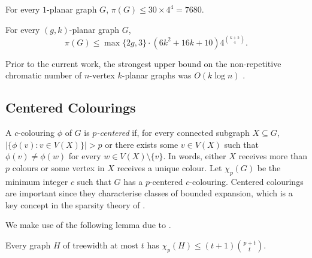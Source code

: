 \documentclass{patmorin}
\renewcommand{\ge}{\geqslant}
\renewcommand{\le}{\leqslant}
\renewcommand{\leq}{\leqslant}
\begin{document}
\begin{cor}
  For every $1$-planar graph $G$, $\pi(G)\le 30\times 4^4=7680$. 
\end{cor}

\begin{cor}
  For every $(g,k)$-planar graph $G$, 
  \[ 
    \pi(G)\le \max\{2g,3\}\cdot(6k^2+16k+10) 4^{\binom{k+5}{4}}. 
     \]
\end{cor}



Prior to the current work, the strongest upper bound on the non-repetitive chromatic number of $n$-vertex  $k$-planar graphs was $O(k\log n)$ \cite{dujmovic.morin.ea:layered}.

\subsection{Centered Colourings}

A $c$-colouring $\phi$ of $G$ is \emph{$p$-centered} if, for every connected subgraph $X\subseteq G$, $|\{\phi(v):v\in V(X)\}| > p$ or there exists some $v\in V(X)$ such that $\phi(v)\neq \phi(w)$ for every $w\in V(X)\setminus\{v\}$.  In words, either $X$ receives more than $p$ colours or some vertex in $X$ receives a unique colour.  Let $\chi_p(G)$ be the minimum integer $c$ such that $G$ has a $p$-centered $c$-colouring. 
Centered colourings are important since they characterise classes of bounded expansion, which is a key concept in the sparsity theory of \citet{Sparsity}. 

We make use of the following lemma due to \citet{pilipczuk.siebertz:polynomial-soda}.

\begin{lem}
\label{p-centered-treewidth}
Every graph $H$ of treewidth at most $t$ has $\chi_p(H)\leq  (t+1)\binom{p+t}{t}$.
\end{lem}
\end{document}
